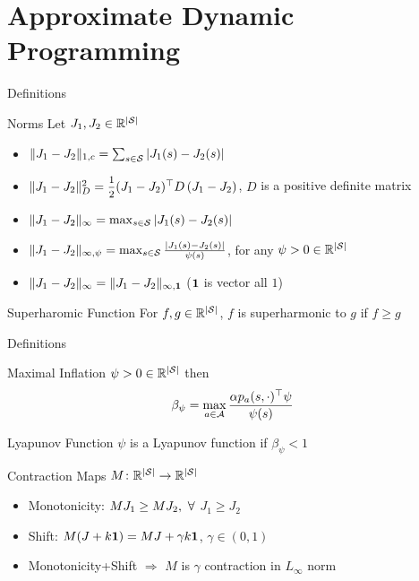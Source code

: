 \documentclass[10pt,handout]{beamer}
\begin{document}
\section{Approximate Dynamic Programming}


\begin{frame}[fragile]{Definitions}
\begin{block}{Norms}
Let $J_1,J_2\in \mathbb{R}^{|\mathcal{S}|}$
\begin{itemize}
\item $\|J_1-J_2\|_{1,c}=\sum_{s\in \mathcal{S}} \left|J_1(s)-J_2(s)\right|$
\item $\norm{J_1-J_2}^2_{D}=\mfrac{1}{2}(J_1-J_2)^\top D \,(J_1-J_2)$, $D$ is a positive definite matrix
\item $\|J_1-J_2\|_\infty=\max_{s\in \mathcal{S}}\left|J_1(s)-J_2(s)\right|$
\item $\|J_1-J_2\|_{\infty,\psi}=\max_{s\in \mathcal{S}}\frac{\left|J_1(s)-J_2(s)\right|}{\psi(s)}$, for any $\psi>0 \in \mathbb{R}^{|\mathcal{S}|}$
\item $\|J_1-J_2\|_{\infty}=\|J_1-J_2\|_{\infty,\mathbf{1}}$ ($\mathbf{1}$ is vector all $1$)
\end{itemize}
\end{block}


\begin{block}{Superharomic Function}
For $f,g \in \mathbb{R}^{|\mathcal{S}|}$, $f$ is superharmonic to $g$ if $f\geq g$
\end{block}
\end{frame}

\begin{frame}[fragile]{Definitions}
\begin{block}{Maximal Inflation}
$\psi>0\in \mathbb{R}^{|\mathcal{S}|}$ then
\begin{align*}
\beta_\psi=\max_{a\in \mathcal{A}}\frac{\alpha p_a(s,\cdot)^\top \psi}{\psi(s)}
\end{align*}
\end{block}
\begin{block}{Lyapunov Function}
$\psi$ is a Lyapunov function if $\beta_\psi<1$
\end{block}

\begin{block}{Contraction Maps}
$M\colon \mathbb{R}^{|\mathcal{S}|}\rightarrow\mathbb{R}^{|\mathcal{S}|}$
\begin{itemize}
\item {Monotonicity:} $M J_1\geq M J_2, \mbox{ } \forall$ $J_1\geq J_2$
\item {Shift:} $M (J+k\mathbf{1})= M J+\gamma k\mathbf{1}$, $\gamma \in (0,1)$
\item Monotonicity+Shift $\Rightarrow$ $M$ is $\gamma$ contraction in $L_\infty$ norm
\end{itemize}
\end{block}

\end{frame}
\end{document}
